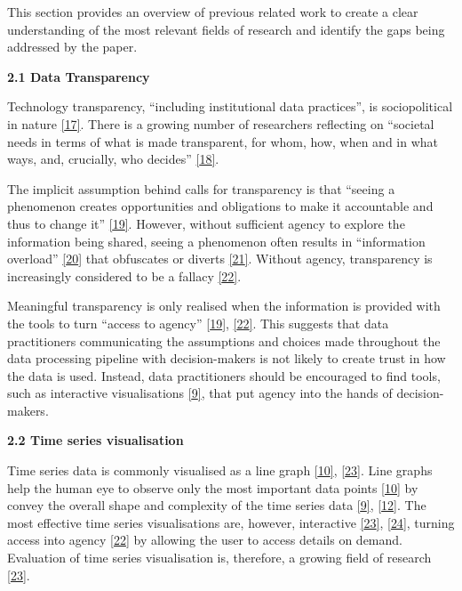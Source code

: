\documentclass{article}
\begin{document}
\label{sec:headings}

This section provides an overview of previous related work to create a
clear understanding of the most relevant fields of research and identify
the gaps being addressed by the paper.

\textbf{2.1 Data Transparency}

Technology transparency, ``including institutional data practices'', is
sociopolitical in nature
\protect\hyperlink{ref-political_transparency}{{[}17{]}}. There is a
growing number of researchers reflecting on ``societal needs in terms of
what is made transparent, for whom, how, when and in what ways, and,
crucially, who decides''
\protect\hyperlink{ref-social_transparency}{{[}18{]}}.

The implicit assumption behind calls for transparency is that ``seeing a
phenomenon creates opportunities and obligations to make it accountable
and thus to change it''
\protect\hyperlink{ref-transparency_lack}{{[}19{]}}. However, without
sufficient agency to explore the information being shared, seeing a
phenomenon often results in ``information overload''
\protect\hyperlink{ref-digital_transparency}{{[}20{]}} that obfuscates
or diverts \protect\hyperlink{ref-transparency_obfuscation}{{[}21{]}}.
Without agency, transparency is increasingly considered to be a fallacy
\protect\hyperlink{ref-transparency_fallacy}{{[}22{]}}.

Meaningful transparency is only realised when the information is
provided with the tools to turn ``access to agency''
\protect\hyperlink{ref-transparency_lack}{{[}19{]}},
\protect\hyperlink{ref-transparency_fallacy}{{[}22{]}}. This suggests
that data practitioners communicating the assumptions and choices made
throughout the data processing pipeline with decision-makers is not
likely to create trust in how the data is used. Instead, data
practitioners should be encouraged to find tools, such as interactive
visualisations \protect\hyperlink{ref-datapoint}{{[}9{]}}, that put
agency into the hands of decision-makers.

\textbf{2.2 Time series visualisation}

Time series data is commonly visualised as a line graph
\protect\hyperlink{ref-Sveinn}{{[}10{]}},
\protect\hyperlink{ref-timenotes}{{[}23{]}}. Line graphs help the human
eye to observe only the most important data points
\protect\hyperlink{ref-Sveinn}{{[}10{]}} by convey the overall shape and
complexity of the time series data
\protect\hyperlink{ref-datapoint}{{[}9{]}},
\protect\hyperlink{ref-downsampling}{{[}12{]}}. The most effective time
series visualisations are, however, interactive
\protect\hyperlink{ref-timenotes}{{[}23{]}},
\protect\hyperlink{ref-plotly}{{[}24{]}}, turning access into agency
\protect\hyperlink{ref-transparency_fallacy}{{[}22{]}} by allowing the
user to access details on demand. Evaluation of time series
visualisation is, therefore, a growing field of research
\protect\hyperlink{ref-timenotes}{{[}23{]}}.
\end{document}
